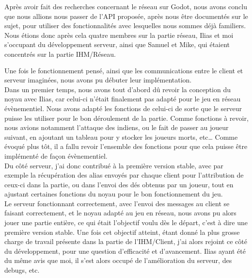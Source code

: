 \documentclass[a4paper,11pt]{article}
\begin{document}
    Après avoir fait des recherches concernant le réseau sur Godot, nous avons conclu que nous allions nous passer de l’API proposée, après nous être documentés sur le sujet, pour utiliser des fonctionnalités avec lesquelles nous sommes déjà familiers. \\

    Nous étions donc après cela quatre membres sur la partie réseau, Ilias et moi s’occupant du développement serveur, ainsi que Samuel et Mike, qui étaient concentrés sur la partie IHM/Réseau.

\newpage

	Une fois le fonctionnement pensé, ainsi que les communications entre le client et serveur imaginées, nous avons pu débuter leur implémentation. \\

    Dans un premier temps, nous avons tout d’abord dû revoir la conception du noyau avec Ilias, car celui-ci n’était finalement pas adapté pour le jeu en réseau évènementiel. Nous avons adapté les fonctions de celui-ci de sorte que le serveur puisse les utiliser pour le bon déroulement de la partie. Comme fonctions à revoir, nous avions notamment l’attaque des indiens, ou le fait de passer au joueur suivant, en ajoutant un tableau pour y stocker les joueurs morts, etc… Comme évoqué plus tôt, il a fallu revoir l’ensemble des fonctions pour que cela puisse être implémenté de façon évènementiel. \\

    Du côté serveur, j’ai donc contribué à la première version stable, avec par exemple la récupération des alias envoyés par chaque client pour l’attribution de ceux-ci dans la partie, ou dans l’envoi des dés obtenus par un joueur, tout en ajustant certaines fonctions du noyau pour le bon fonctionnement du jeu. \\

    Le serveur fonctionnant correctement, avec l’envoi des messages au client se faisant correctement, et le noyau adapté au jeu en réseau, nous avons pu alors jouer une partie entière, ce qui était l’objectif voulu dès le départ, c’est à dire une première version stable. Une fois cet objectif atteint, étant donné la plus grosse charge de travail présente dans la partie de l’IHM/Client, j’ai alors rejoint ce côté du développement, pour une question d’efficacité et d’avancement. Ilias ayant été du même avis que moi, il s’est alors occupé de l’amélioration du serveur, des debugs, etc. \\
\end{document}
